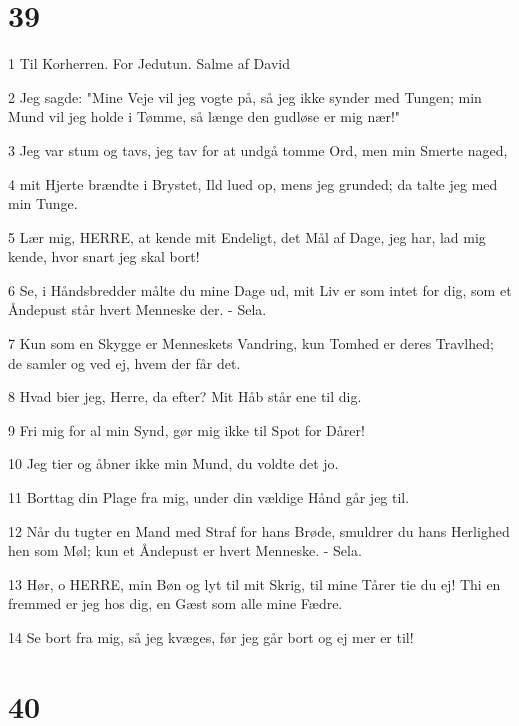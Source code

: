 \chapter{39}

\par 1 Til Korherren. For Jedutun. Salme af David
\par 2 Jeg sagde: "Mine Veje vil jeg vogte på, så jeg ikke synder med Tungen; min Mund vil jeg holde i Tømme, så længe den gudløse er mig nær!"
\par 3 Jeg var stum og tavs, jeg tav for at undgå tomme Ord, men min Smerte naged,
\par 4 mit Hjerte brændte i Brystet, Ild lued op, mens jeg grunded; da talte jeg med min Tunge.
\par 5 Lær mig, HERRE, at kende mit Endeligt, det Mål af Dage, jeg har, lad mig kende, hvor snart jeg skal bort!
\par 6 Se, i Håndsbredder målte du mine Dage ud, mit Liv er som intet for dig, som et Åndepust står hvert Menneske der. - Sela.
\par 7 Kun som en Skygge er Menneskets Vandring, kun Tomhed er deres Travlhed; de samler og ved ej, hvem der får det.
\par 8 Hvad bier jeg, Herre, da efter? Mit Håb står ene til dig.
\par 9 Fri mig for al min Synd, gør mig ikke til Spot for Dårer!
\par 10 Jeg tier og åbner ikke min Mund, du voldte det jo.
\par 11 Borttag din Plage fra mig, under din vældige Hånd går jeg til.
\par 12 Når du tugter en Mand med Straf for hans Brøde, smuldrer du hans Herlighed hen som Møl; kun et Åndepust er hvert Menneske. - Sela.
\par 13 Hør, o HERRE, min Bøn og lyt til mit Skrig, til mine Tårer tie du ej! Thi en fremmed er jeg hos dig, en Gæst som alle mine Fædre.
\par 14 Se bort fra mig, så jeg kvæges, før jeg går bort og ej mer er til!

\chapter{40}

